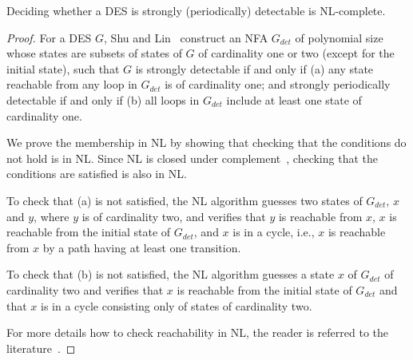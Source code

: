 \documentclass[twocolumn,amsthm]{autartx}
\begin{document}
  \begin{thm}\label{thm_sdnl-c}
    Deciding whether a DES is strongly (periodically) detectable is NL-complete.
  \end{thm}
  \begin{proof}
    For a DES $G$, Shu and Lin~\cite{ShuLin2011} construct an NFA $G_{det}$ of polynomial size whose states are subsets of states of $G$ of cardinality one or two (except for the initial state), such that $G$ is strongly detectable if and only if 
    (a) any state reachable from any loop in $G_{det}$ is of cardinality one;
    and strongly periodically detectable if and only if 
    (b) all loops in $G_{det}$ include at least one state of cardinality one. 

    We prove the membership in NL by showing that checking that the conditions do not hold is in NL. Since NL is closed under complement~\cite{Immerman88,Szelepcsenyi87}, checking that the conditions are satisfied is also in NL. 
    
    To check that (a) is not satisfied, the NL algorithm guesses two states of $G_{det}$, $x$ and $y$, where $y$ is of cardinality two, and verifies that
      $y$ is reachable from $x$, 
      $x$ is reachable from the initial state of $G_{det}$, and 
      $x$ is in a cycle, i.e., $x$ is reachable from $x$ by a path having at least one transition.
    
    To check that (b) is not satisfied, the NL algorithm guesses a state $x$ of $G_{det}$ of cardinality two and verifies that 
      $x$ is reachable from the initial state of $G_{det}$ and 
      that $x$ is in a cycle consisting only of states of cardinality two.
    
    For more details how to check reachability in NL, the reader is referred to the literature~\cite{Masopust2018}.
    

\end{proof}
\end{document}
